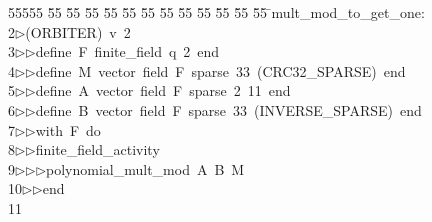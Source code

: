 %
%
\begin{tabbing}
55555 \= 55 \= 55 \= 55 \= 55 \= 55 \= 55 \= 55 \= 55 \= 55 \= 55 \= 55 \= 55 \= \>mult\_mod\_to\_get\_one:\\[0pt]
2\>$\triangleright$\>(ORBITER)\ v\ 2\ \\[0pt]
3\>$\triangleright$\>$\triangleright$\>define\ F\ finite\_field\ q\ 2\ end\ \\[0pt]
4\>$\triangleright$\>$\triangleright$\>define\ M\ vector\ field\ F\ sparse\ 33\ (CRC32\_SPARSE)\ end\ \\[0pt]
5\>$\triangleright$\>$\triangleright$\>define\ A\ vector\ field\ F\ sparse\ 2\ 11\ end\ \\[0pt]
6\>$\triangleright$\>$\triangleright$\>define\ B\ vector\ field\ F\ sparse\ 33\ (INVERSE\_SPARSE)\ end\ \\[0pt]
7\>$\triangleright$\>$\triangleright$\>with\ F\ do\ \\[0pt]
8\>$\triangleright$\>$\triangleright$\>finite\_field\_activity\ \\[0pt]
9\>$\triangleright$\>$\triangleright$\>$\triangleright$\>polynomial\_mult\_mod\ A\ B\ M\ \\[0pt]
10\>$\triangleright$\>$\triangleright$\>end\\[0pt]
11\>\end{tabbing}
